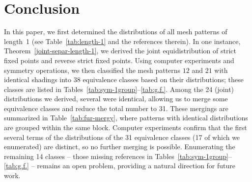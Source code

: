 \documentclass[10pt,a4paper]{article}
\begin{document}
\section{Conclusion}
In this paper, we first determined the distributions of all mesh patterns of length~1 (see Table~\ref{tab:length-1} and the references therein). In one instance, Theorem~\ref{joint-separ-length-1}, we derived the joint equidistribution of strict fixed points and reverse strict fixed points. Using computer experiments and symmetry operations, we then classified the mesh patterns $12$ and $21$ with identical shadings into 38 equivalence classes based on their distributions; these classes are listed in Tables~\ref{tab:sym-1group}--\ref{tab:g.f.}. Among the 24 (joint) distributions we derived, several were identical, allowing us to merge some equivalence classes and reduce the total number to 31. These mergings are summarized in Table~\ref{tab:fur-mergy}, where patterns with identical distributions are grouped within the same block. Computer experiments confirm that the first several terms of the distributions of the 31 equivalence classes (17 of which we enumerated) are distinct, so no further merging is possible. Enumerating the remaining 14 classes -- those missing references in Tables~\ref{tab:sym-1group}--\ref{tab:g.f.} -- remains an open problem, providing a natural direction for future work.
\end{document}
